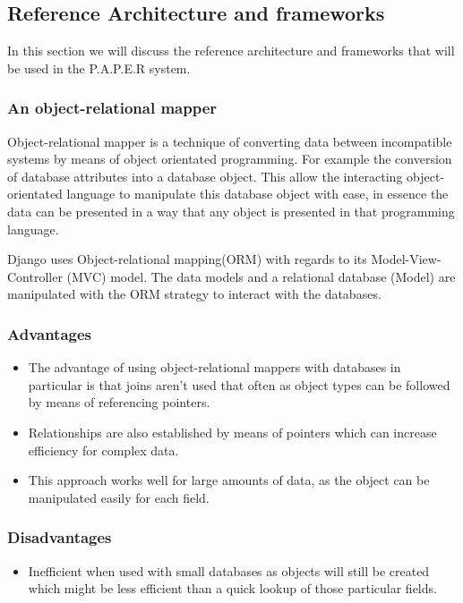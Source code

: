 \documentclass{article}
\begin{document}
		
		\subsection{Reference Architecture and frameworks}\label{sec: ReferencArchitecture}
In this section we will discuss the reference architecture and frameworks that will be used in the P.A.P.E.R system.
	\subsubsection{An object-relational mapper}\label{subsec: ORM}
	Object-relational mapper is a technique of converting data between incompatible systems by means of object orientated programming. For example the conversion of database attributes into a database object. This allow the interacting object-orientated language to manipulate this database object with ease, in essence the data can be presented in a way that any object is presented in that programming language.
	
	Django uses Object-relational mapping(ORM) with regards to its Model-View-Controller (MVC) model.
	The data models and a relational database (Model) are manipulated with the ORM strategy to interact with the databases.
		
	
	\subsubsection{Advantages}
	\begin{itemize}
	\item
	The advantage of using object-relational mappers with databases in particular is that joins aren't used that often as object types can be followed by means of referencing pointers. 
	\item
	Relationships are also established by means of pointers which can increase efficiency for complex data.
	\item
	This approach works well for large amounts of data, as the object can be manipulated easily for each field.
	\end{itemize}
	
	\subsubsection{Disadvantages}
	
	\begin{itemize}
	\item
	 Inefficient when used with small databases as objects will still be created which might be less efficient than a quick lookup of those particular fields. 
	\end{itemize}
	
\end{document}

